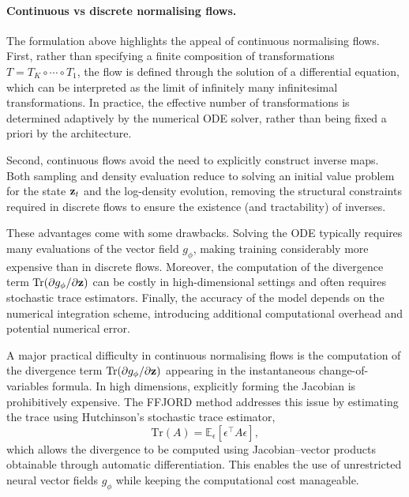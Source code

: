 \paragraph{Continuous vs discrete normalising flows.}
The formulation above highlights the appeal of continuous normalising flows. First, rather than specifying a finite composition of transformations $T = T_K \circ \cdots \circ T_1$, the flow is defined through the solution of a differential equation, which can be interpreted as the limit of infinitely many infinitesimal transformations. In practice, the effective number of transformations is determined adaptively by the numerical ODE solver, rather than being fixed a priori by the architecture.

Second, continuous flows avoid the need to explicitly construct inverse maps. Both sampling and density evaluation reduce to solving an initial value problem for the state ${ \mathbf{z}}_t$ and the log-density evolution, removing the structural constraints required in discrete flows to ensure the existence (and tractability) of inverses.

These advantages come with some drawbacks. Solving the ODE typically requires many evaluations of the vector field $g_\phi$, making training considerably more expensive than in discrete flows. Moreover, the computation of the divergence term $\mathrm{Tr}(\partial g_\phi/\partial { \mathbf{z}})$ can be costly in high-dimensional settings and often requires stochastic trace estimators. Finally, the accuracy of the model depends on the numerical integration scheme, introducing additional computational overhead and potential numerical error.

\begin{remark}
A major practical difficulty in continuous normalising flows is the computation of the divergence term $\mathrm{Tr}(\partial g_\phi/\partial { \mathbf{z}})$ appearing in the instantaneous change-of-variables formula. In high dimensions, explicitly forming the Jacobian is prohibitively expensive. The FFJORD method \cite{grathwohl2019ffjord} addresses this issue by estimating the trace using Hutchinson's stochastic trace estimator,
\[
\mathrm{Tr}(A) = \mathbb{E}_{\epsilon}[\epsilon^\top A \epsilon],
\]
which allows the divergence to be computed using Jacobian--vector products obtainable through automatic differentiation. This enables the use of unrestricted neural vector fields $g_\phi$ while keeping the computational cost manageable.
\end{remark}

